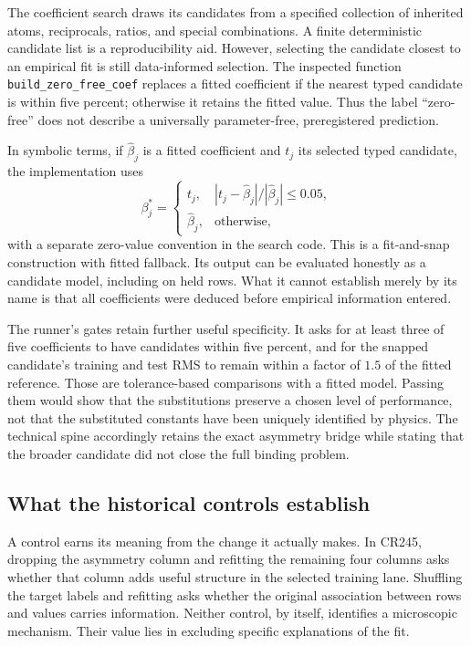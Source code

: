 The coefficient search draws its candidates from a specified collection of inherited atoms, reciprocals, ratios, and special combinations. A finite deterministic candidate list is a reproducibility aid. However, selecting the candidate closest to an empirical fit is still data-informed selection. The inspected function \texttt{build\_zero\_free\_coef} replaces a fitted coefficient if the nearest typed candidate is within five percent; otherwise it retains the fitted value. Thus the label ``zero-free'' does not describe a universally parameter-free, preregistered prediction.

In symbolic terms, if $\widehat\beta_j$ is a fitted coefficient and $t_j$ its selected typed candidate, the implementation uses
\begin{equation}
 \beta_j^*=\begin{cases}
 t_j,& |t_j-\widehat\beta_j|/|\widehat\beta_j|\leq0.05,\\
 \widehat\beta_j,&\text{otherwise},
 \end{cases}
 \label{v2c5:snap}
\end{equation}
with a separate zero-value convention in the search code. This is a fit-and-snap construction with fitted fallback. Its output can be evaluated honestly as a candidate model, including on held rows. What it cannot establish merely by its name is that all coefficients were deduced before empirical information entered.

The runner's gates retain further useful specificity. It asks for at least three of five coefficients to have candidates within five percent, and for the snapped candidate's training and test RMS to remain within a factor of $1.5$ of the fitted reference. Those are tolerance-based comparisons with a fitted model. Passing them would show that the substitutions preserve a chosen level of performance, not that the substituted constants have been uniquely identified by physics. The technical spine accordingly retains the exact asymmetry bridge while stating that the broader candidate did not close the full binding problem.

\subsection{What the historical controls establish}
\label{v2c5:controls}

A control earns its meaning from the change it actually makes. In CR245, dropping the asymmetry column and refitting the remaining four columns asks whether that column adds useful structure in the selected training lane. Shuffling the target labels and refitting asks whether the original association between rows and values carries information. Neither control, by itself, identifies a microscopic mechanism. Their value lies in excluding specific explanations of the fit.

